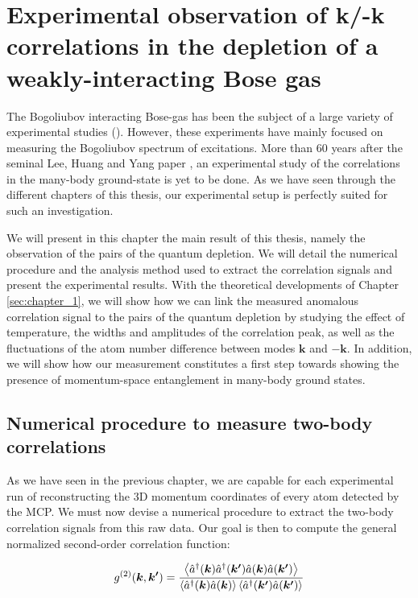 \chapter{Experimental observation of k/-k correlations in the depletion of a weakly-interacting Bose gas}

\label{sec:chapter_4}

The Bogoliubov interacting Bose-gas has been the subject of a large variety of experimental studies (\cite{fontaine2018,miller1962,ozeri2005,stepanov2019}). However, these experiments have mainly focused on measuring the Bogoliubov spectrum of excitations. More than 60 years after the seminal Lee, Huang and Yang paper \cite{lee1957}, an experimental study of the correlations in the many-body ground-state is yet to be done. As we have seen through the different chapters of this thesis, our experimental setup is perfectly suited for such an investigation. 

We will present in this chapter the main result of this thesis, namely the observation of the \kmk pairs of the quantum depletion. We will detail the numerical procedure and the analysis method used to extract the correlation signals and present the experimental results. With the theoretical developments of Chapter \ref{sec:chapter_1}, we will show how we can link the measured anomalous correlation signal to the \kmk pairs of the quantum depletion by studying the effect of temperature, the widths and amplitudes of the correlation peak, as well as the fluctuations of the atom number difference between modes $\bm{k}$ and $-\bm{k}$. In addition, we will show how our measurement constitutes a first step towards showing the presence of momentum-space entanglement in many-body ground states.

\section{Numerical procedure to measure two-body correlations}

\label{sec:numerical_calculation}

As we have seen in the previous chapter, we are capable for each experimental run of reconstructing the 3D momentum coordinates of every atom detected by the MCP. We must now devise a numerical procedure to extract the two-body correlation signals from this raw data. Our goal is then to compute the general normalized second-order correlation function:

\begin{equation}
    g^{(2)} (\bm{k},\bm{k'}) = \frac{\left\langle\hat{a}^{\dagger}(\bm{k}) \hat{a}^{\dagger}(\bm{k'}) \hat{a}(\bm{k}) \hat{a}(\bm{k'})\right\rangle}{\left\langle\hat{a}^{\dagger}(\bm{k}) \hat{a}(\bm{k}) \right\rangle \left\langle\hat{a}^{\dagger}(\bm{k'}) \hat{a}(\bm{k'}) \right\rangle}
\end{equation}

